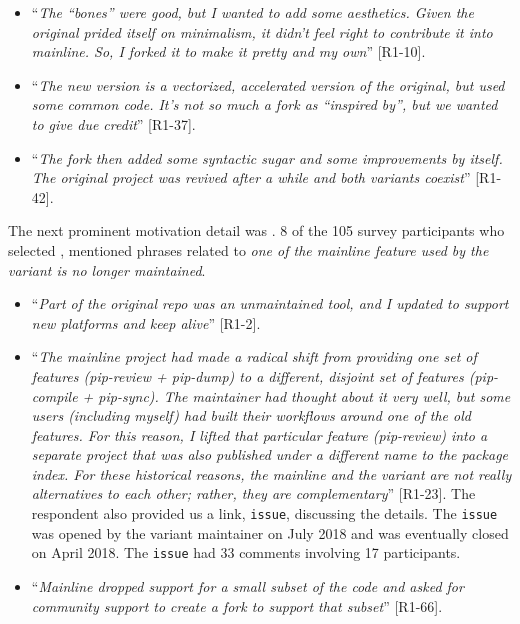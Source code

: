 \begin{itemize}[leftmargin=*]
\item ``\emph{The ``bones'' were good, but I wanted to add some aesthetics. Given the original prided itself on minimalism, it didn't feel right to contribute it into mainline. So, I forked it to make it pretty and my own}'' [R1-10].
\item ``\emph{The new version is a vectorized, accelerated version of the original, but used some common code. It's not so much a fork as ``inspired by'', but we wanted to give due credit}'' [R1-37].
\item ``\emph{The fork then added some syntactic sugar and some improvements by itself. The original project was revived after a while and both variants coexist}'' [R1-42].
\end{itemize}

\nd The next prominent  motivation detail was .
8 of the 105 survey participants who selected , mentioned phrases related to \emph{one of the mainline feature used by the variant is no longer maintained}.

\begin{itemize}[leftmargin=*]
\item ``\emph{Part of the original repo was an unmaintained tool, and I updated to support new platforms and keep alive}'' [R1-2].
\item ``\emph{The mainline project had made a radical shift from providing one set of features (pip-review + pip-dump) to a different, disjoint set of features (pip-compile + pip-sync). The maintainer had thought about it very well, but some users (including myself) had built their workflows around one of the old features. For this reason, I lifted that particular feature (pip-review) into a separate project that was also published under a different name to the package index. For these historical reasons, the mainline and the variant are not really alternatives to each other; rather, they are complementary}'' [R1-23]. The respondent also provided us a link, \gh \texttt{issue}, discussing the details. The \texttt{issue} was opened by the variant maintainer on July 2018 and was eventually closed on April 2018. The \texttt{issue} had 33 comments involving 17 participants. %

\item ``\textit{Mainline dropped support for a small subset of the code and asked for community support to create a fork to support that subset}'' [R1-66].
\end{itemize}

